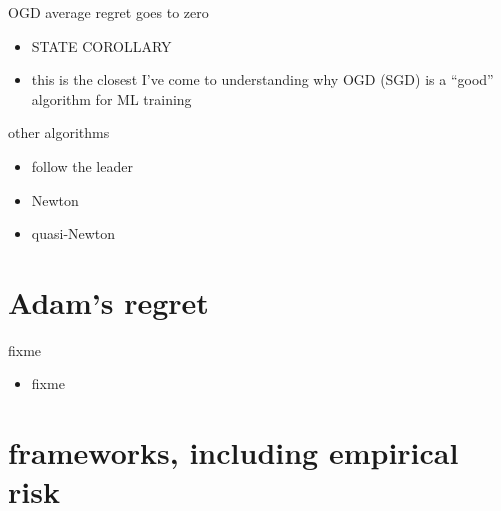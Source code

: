 \documentclass[xcolor={svgnames},
               hyperref={colorlinks,citecolor=DeepPink4,linkcolor=FireBrick,urlcolor=Maroon}]
               {beamer}
\begin{document}
\begin{frame}{OGD average regret goes to zero}

\begin{itemize}
\item STATE COROLLARY
\item this is the closest I've come to understanding why OGD (SGD) is a ``good'' algorithm for ML training
\end{itemize}
\end{frame}


\begin{frame}{other algorithms}

\begin{itemize}
\item follow the leader
\item Newton
\item quasi-Newton
\end{itemize}
\end{frame}


\section{Adam's regret}

\begin{frame}{fixme}

\begin{itemize}
\item fixme
\end{itemize}
\end{frame}


\section{frameworks, including empirical risk}
\end{document}
